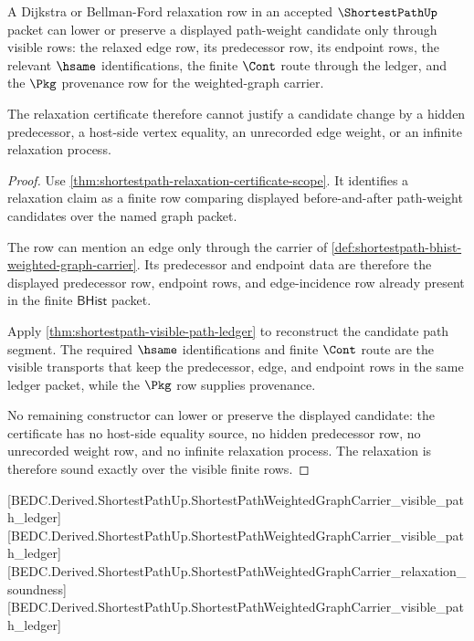 \begin{theorem}
\label{thm:shortestpath-relaxation-soundness}
A Dijkstra or Bellman-Ford relaxation row in an accepted $\ShortestPathUp$
packet can lower or preserve a displayed path-weight candidate only through
visible rows: the relaxed edge row, its predecessor row, its endpoint rows,
the relevant $\hsame$ identifications, the finite $\Cont$ route through the
ledger, and the $\Pkg$ provenance row for the weighted-graph carrier.

The relaxation certificate therefore cannot justify a candidate change by a
hidden predecessor, a host-side vertex equality, an unrecorded edge weight, or
an infinite relaxation process.
\end{theorem}
\begin{proof}
Use \autoref{thm:shortestpath-relaxation-certificate-scope}. It identifies a
relaxation claim as a finite row comparing displayed before-and-after
path-weight candidates over the named graph packet.

The row can mention an edge only through the carrier of
\autoref{def:shortestpath-bhist-weighted-graph-carrier}. Its predecessor and
endpoint data are therefore the displayed predecessor row, endpoint rows, and
edge-incidence row already present in the finite $\mathsf{BHist}$ packet.

Apply \autoref{thm:shortestpath-visible-path-ledger} to reconstruct the
candidate path segment. The required $\hsame$ identifications and finite
$\Cont$ route are the visible transports that keep the predecessor, edge, and
endpoint rows in the same ledger packet, while the $\Pkg$ row supplies
provenance.

No remaining constructor can lower or preserve the displayed candidate: the
certificate has no host-side equality source, no hidden predecessor row, no
unrecorded weight row, and no infinite relaxation process. The relaxation is
therefore sound exactly over the visible finite rows.
\end{proof}

[BEDC.Derived.ShortestPathUp.ShortestPathWeightedGraphCarrier\_visible\_path\_ledger]
[BEDC.Derived.ShortestPathUp.ShortestPathWeightedGraphCarrier\_visible\_path\_ledger]
[BEDC.Derived.ShortestPathUp.ShortestPathWeightedGraphCarrier\_relaxation\_soundness]
[BEDC.Derived.ShortestPathUp.ShortestPathWeightedGraphCarrier\_visible\_path\_ledger]

